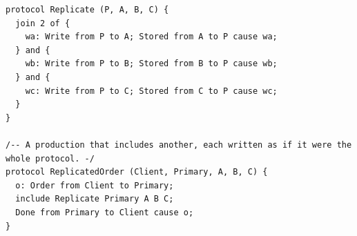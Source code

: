 \begin{lstlisting}[language={}]
protocol Replicate (P, A, B, C) {
  join 2 of {
    wa: Write from P to A; Stored from A to P cause wa;
  } and {
    wb: Write from P to B; Stored from B to P cause wb;
  } and {
    wc: Write from P to C; Stored from C to P cause wc;
  }
}

/-- A production that includes another, each written as if it were the whole protocol. -/
protocol ReplicatedOrder (Client, Primary, A, B, C) {
  o: Order from Client to Primary;
  include Replicate Primary A B C;
  Done from Primary to Client cause o;
}
\end{lstlisting}
